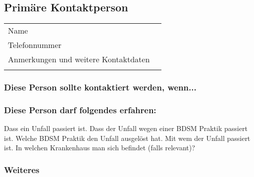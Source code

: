 \documentclass[a4paper,12pt]{article}
\begin{document}
\newpage
\subsection{Primäre Kontaktperson}
\begin{Form}
	\begin{tabular}{P|l}
		Name & \TextField[name=Contact1Name,width=25em]{}\\
		\hdashline
		Telefonnummer & \TextField[name=Contact1Telefon,width=25em]{} \\
		\hdashline
		Anmerkungen und weitere Kontaktdaten & \TextField[name=Contact1Kommentar,multiline=true,height=6em, width=25em]{} \\
		\hdashline
	\end{tabular}
\end{Form}

\subsubsection{Diese Person sollte kontaktiert werden, wenn...}
\TextField[name=Contact1KontaktWenn,multiline=true,height=7em, width=37em]{}

\subsubsection{Diese Person darf folgendes erfahren:}

\begin{Form}
	\noindent Dass ein Unfall passiert ist.
	\newline
	\noindent Dass der Unfall wegen einer BDSM Praktik passiert ist.
	\newline
	\noindent Welche BDSM Praktik den Unfall ausgelöst hat.
	\newline
	\noindent Mit wem der Unfall passiert ist.
	\newline
	\noindent In welchen Krankenhaus man sich befindet (falls relevant)?
\end{Form}

\subsubsection{Weiteres}
\end{document}
